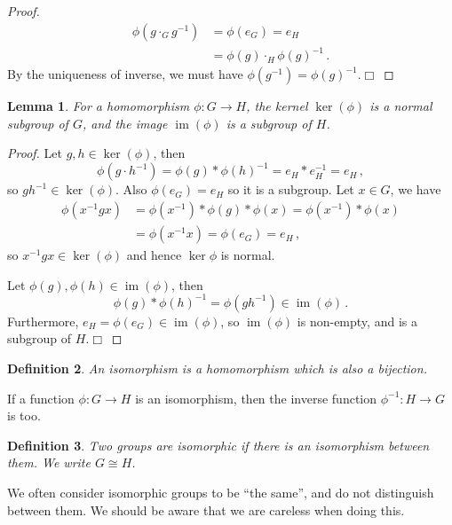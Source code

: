 \documentclass{article}
\theoremstyle{plain}\theoremheaderfont{\normalfont\itshape}\theorembodyfont{\rmfamily}\theoremseparator{.}\newtheorem*{rem}{Remark}\newtheorem*{ex}{Example}\newtheorem*{proof}{Proof}\newtheorem*{altp}{Alternative proof}\newtheorem*{nonex}{Non-Example}
\theoremstyle{plain}\theoremheaderfont{\normalfont\bfseries}\theorembodyfont{\rmfamily}\theoremseparator{.}\newtheorem{thm}{Theorem}[section]\newtheorem{lem}[thm]{Lemma}\newtheorem{prop}[thm]{Proposition}\newtheorem*{cor}{Corollary}\newtheorem{defn}[thm]{Definition}\newtheorem{clm}[thm]{Claim}\newtheorem{clminproof}{Claim}\newtheorem*{notn}{Notation}\newtheorem*{exer}{Exercise}\newtheorem*{lemnn}{Lemma}
\theoremstyle{break}\theoremheaderfont{\normalfont\itshape}\theorembodyfont{\rmfamily}\theoremseparator{.\medskip}\newtheorem*{proofskip}{Proof}\newtheorem*{exs}{Examples}\newtheorem*{rems}{Remarks}\newtheorem*{obs}{Observations}
\theoremstyle{break}\theoremheaderfont{\normalfont\bfseries}\theorembodyfont{\rmfamily}\theoremseparator{.\medskip}\newtheorem{lemskip}[thm]{Lemma}\newtheorem{defnskip}[thm]{Definition}\newtheorem{propskip}[thm]{Proposition}\newtheorem{thmskip}[thm]{Theorem}
\numberwithin{equation}{section}
\newcommand{\qed}{\hfill\ensuremath{\Box}}
\DeclareMathOperator*{\im}{im}
\begin{document}
    \begin{proof}
        \begin{align*}
            \phi(g\cdot_G g^{-1})&=\phi(e_G)=e_H\\
            &=\phi(g)\cdot_H\phi(g)^{-1}\,.
        \end{align*}
        By the uniqueness of inverse, we must have \(\phi(g^{-1})=\phi(g)^{-1}\).\qed
    \end{proof}
    \begin{lem}
        For a homomorphism \(\phi:G\to H\), the kernel \(\ker(\phi)\) is a normal subgroup of \(G\), and the image \(\im(\phi)\) is a subgroup of \(H\).
    \end{lem}
    \begin{proof}
        Let \(g,h\in\ker(\phi)\), then
        \[\phi(g\cdot h^{-1})=\phi(g)*\phi(h)^{-1}=e_H*e_H^{-1}=e_H\,,\]
        so \(gh^{-1}\in\ker(\phi)\). Also \(\phi(e_G)=e_H\) so it is a subgroup. Let \(x\in G\), we have
        \begin{align*}
            \phi(x^{-1}gx)&=\phi(x^{-1})*\phi(g)*\phi(x)=\phi(x^{-1})*\phi(x)\\
            &=\phi(x^{-1}x)=\phi(e_G)=e_H\,,
        \end{align*}
        so \(x^{-1}gx\in\ker(\phi)\) and hence \(\ker\phi\) is normal.

        Let \(\phi(g),\phi(h)\in\im(\phi)\), then
        \[\phi(g)*\phi(h)^{-1}=\phi(gh^{-1})\in\im(\phi)\,.\]
        Furthermore, \(e_H=\phi(e_G)\in\im(\phi)\), so \(\im(\phi)\) is non-empty, and is a subgroup of \(H\).\qed
    \end{proof}
    \begin{defn}
        An \textit{isomorphism} is a homomorphism which is also a bijection.
    \end{defn}
    If a function \(\phi:G\to H\) is an isomorphism, then the inverse function \(\phi^{-1}:H\to G\) is too.
    \begin{defn}
        Two groups are \textit{isomorphic} if there is an isomorphism between them. We write \(G\cong H\).
    \end{defn}

    We often consider isomorphic groups to be ``the same'', and do not distinguish between them. We should be aware that we are careless when doing this.
\end{document}

